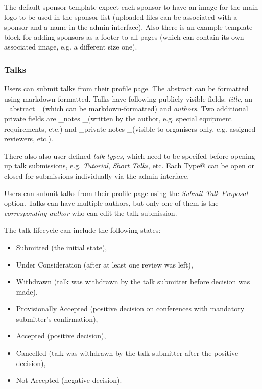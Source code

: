 \documentclass[10pt, a5paper]{article}
\begin{document}
The default sponsor template expect each sponsor to have an image for the main logo to be used in the sponsor list (uploaded files can be associated with a sponsor and a name in the admin interface). Also there is an example template block for adding sponsors as a footer to all pages (which can contain its own associated image, e.g. a different size one).

\subsubsection*{Talks}

Users can submit talks from their profile page. The abstract can be formatted using markdown-formatted. Talks have following publicly visible fields: \emph{title}, an \_abstract \_(which can be markdown-formatted) and \emph{authors}. Two additional private fields are \_notes \_(written by the author, e.g. special equipment requirements, etc.) and \_private notes \_(visible to organisers only, e.g. assigned reviewers, etc.).

There also also user-defined \emph{talk types}, which need to be specifed before opening up talk submissions, e.g. \emph{Tutorial}, \emph{Short Talks}, etc. Each \verb@Talk Type@ can be open or closed for submissions individually via the admin interface.

Users can submit talks from their profile page using the \emph{Submit Talk Proposal} option. Talks can have multiple authors, but only one of them is the \emph{corresponding author} who can edit the talk submission.

The talk lifecycle can include the following states:

\begin{itemize}
  \item Submitted (the initial state),
  \item Under Consideration (after at least one review was left),
  \item Withdrawn (talk was withdrawn by the talk submitter before decision was made),
  \item Provisionally Accepted (positive decision on conferences with \linebreak mandatory submitter's confirmation),
  \item Accepted (positive decision),
  \item Cancelled (talk was withdrawn by the talk submitter after the positive decision),
  \item Not Accepted (negative decision).
\end{itemize}
\end{document}
